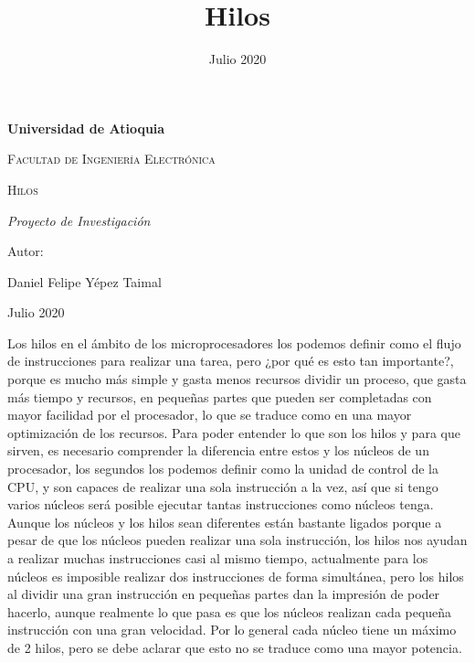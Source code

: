 \documentclass{article}
\title{Hilos}
\date{Julio 2020}
\begin{document}
\begin{titlepage}
\centering
{\bfseries\LARGE Universidad de Atioquia\par}
\vspace{1cm}
{\scshape\Large Facultad de Ingenier\'ia Electr\'onica \par}
\vspace{3cm}
{\scshape\Huge Hilos \par}
\vspace{3cm}
{\itshape\Large Proyecto de Investigaci\'on \par}
\vfill
{\Large Autor: \par}
{\Large Daniel Felipe Y\'epez Taimal \par}
\vfill
{\Large Julio 2020 \par}
\end{titlepage}

\maketitle


Los hilos en el ámbito de los microprocesadores los podemos definir como el flujo de instrucciones para realizar una tarea, pero ¿por qué es esto tan importante?, porque es mucho más simple y gasta menos recursos dividir un proceso, que gasta más tiempo y recursos, en pequeñas partes que pueden ser completadas con mayor facilidad por el procesador, lo que se traduce como en una mayor optimización de los recursos. Para poder entender lo que son los hilos y para que sirven, es necesario comprender la diferencia entre estos y los núcleos de un procesador, los segundos los podemos definir como la unidad de control de la CPU, y son capaces de realizar una sola instrucción a la vez, así que si tengo varios núcleos será posible ejecutar tantas instrucciones como núcleos tenga. \\

Aunque los núcleos y los hilos sean diferentes están bastante ligados porque a pesar de que los núcleos pueden realizar una sola instrucción, los hilos nos ayudan a realizar muchas instrucciones casi al mismo tiempo, actualmente para los núcleos es imposible realizar dos instrucciones de forma simultánea, pero los hilos al dividir una gran instrucción en pequeñas partes dan la impresión de poder hacerlo, aunque realmente lo que pasa es que  los núcleos realizan cada pequeña instrucción con una gran velocidad. Por lo general cada núcleo tiene un máximo de 2 hilos, pero se debe aclarar que esto no se traduce como una mayor potencia.\\
\end{document}
